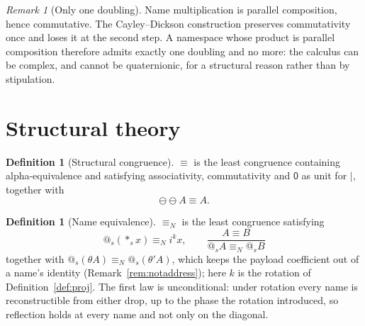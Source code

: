 \documentclass[11pt]{article}
\makeatletter
\theoremstyle{definition}
\newtheorem{definition}[theorem]{Definition}
\theoremstyle{remark}
\newtheorem{remark}[theorem]{Remark}
\newcommand{\pzero}{\mathsf{0}}
\newcommand{\quo}[1]{\ensuremath{@_{#1}}}
\newcommand{\drp}[1]{\ensuremath{*_{#1}}}
\newcommand{\negop}{\ensuremath{\ominus}}
\newcommand{\scong}{\ensuremath{\equiv}}
\newcommand{\nameq}{\ensuremath{\equiv_{N}}}
\makeatother
\begin{document}
\begin{remark}[Only one doubling]
Name multiplication is parallel composition, hence commutative. The
Cayley--Dickson construction preserves commutativity once and loses it at the
second step. A namespace whose product is parallel composition therefore admits
exactly one doubling and no more: the calculus can be complex, and cannot be
quaternionic, for a structural reason rather than by stipulation.
\end{remark}

\section{Structural theory}
\label{sec:structural}

\begin{definition}[Structural congruence]
\label{def:scong}
$\scong$ is the least congruence containing alpha-equivalence and satisfying
associativity, commutativity and $\pzero$ as unit for $\mid$, together with
\[
  \negop\negop A \scong A .
\]
\end{definition}

\begin{definition}[Name equivalence]
\label{def:nameq}
$\nameq$ is the least congruence satisfying
\[
  \quo{s}(\drp{s}x) \nameq i^{k}x,
  \qquad
  \frac{A \scong B}{\quo{s}A \nameq \quo{s}B}
\]
together with $\quo{s}(\theta A) \nameq \quo{s}(\theta' A)$, which keeps the
payload coefficient out of a name's identity
(Remark~\ref{rem:notaddress}); here $k$ is the rotation of
Definition~\ref{def:proj}. The first law is
unconditional: under rotation every name is reconstructible from either drop, up
to the phase the rotation introduced, so reflection holds at every name and not
only on the diagonal.
\end{definition}
\end{document}
